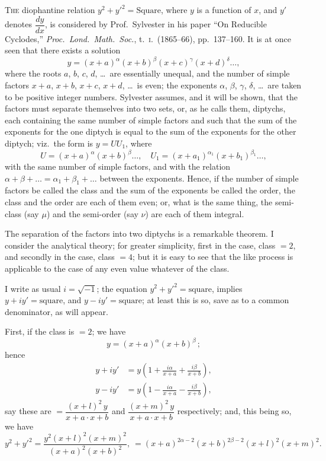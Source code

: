 \documentclass[11pt,a4paper]{article}
\theoremstyle{plain}
\theoremstyle{definition}
\begin{document}
\textsc{The} diophantine relation $y^2 + y'^2 = \text{Square}$, where $y$ is a function of $x$, and $y'$ denotes $\dfrac{dy}{dx}$, is considered by Prof.~Sylvester in his paper ``On Reducible Cyclodes,'' \textit{Proc.\ Lond.\ Math.\ Soc.}, t.\ \textsc{i}.\ (1865--66), pp.\ 137--160. It is at once seen that there exists a solution
\[ y = (x+a)^{\alpha} (x+b)^{\beta} (x+c)^{\gamma} (x+d)^{\delta} \ldots, \]
where the roots $a$, $b$, $c$, $d$, \ldots\ are essentially unequal, and the number of simple factors $x+a$, $x+b$, $x+c$, $x+d$, \ldots\ is even; the exponents $\alpha$, $\beta$, $\gamma$, $\delta$, \ldots\ are taken to be positive integer numbers. Sylvester assumes, and it will be shown, that the factors must separate themselves into two sets, or, as he calls them, diptychs, each containing the same number of simple factors and such that the sum of the exponents for the one diptych is equal to the sum of the exponents for the other diptych; viz.\ the form is $y = UU_1$, where
\[ U = (x+a)^{\alpha} (x+b)^{\beta} \ldots,\quad U_1 = (x+a_1)^{\alpha_1} (x+b_1)^{\beta_1} \ldots, \]
with the same number of simple factors, and with the relation $\alpha + \beta + \ldots = \alpha_1 + \beta_1 + \ldots$ between the exponents. Hence, if the number of simple factors be called the class and the sum of the exponents be called the order, the class and the order are each of them even; or, what is the same thing, the semi-class (say $\mu$) and the semi-order (say $\nu$) are each of them integral.

The separation of the factors into two diptychs is a remarkable theorem. I consider the analytical theory; for greater simplicity, first in the case, class $= 2$, and secondly in the case, class $= 4$; but it is easy to see that the like process is applicable to the case of any even value whatever of the class.

I write as usual $i = \sqrt{-1}$; the equation $y^2 + y'^2 = \text{square}$, implies $y + iy' = \text{square}$, and $y - iy' = \text{square}$; at least this is so, save as to a common denominator, as will appear.

First, if the class is $= 2$; we have
\[ y = (x+a)^{\alpha} (x+b)^{\beta}\,; \]
hence
\begin{align*}
y + iy' &= y \left(1 + \frac{i\alpha}{x+a} + \frac{i\beta}{x+b}\right), \\
y - iy' &= y \left(1 - \frac{i\alpha}{x+a} - \frac{i\beta}{x+b}\right),
\end{align*}
say these are $= \dfrac{(x+l)^2\, y}{x+a \cdot x+b}$ and $\dfrac{(x+m)^2\, y}{x+a \cdot x+b}$ respectively; and, this being so, we have
\[ y^2 + y'^2 = \frac{y^2 (x+l)^2 (x+m)^2}{(x+a)^2 (x+b)^2},\ = (x+a)^{2\alpha-2} (x+b)^{2\beta-2} (x+l)^2 (x+m)^2. \]
\end{document}
